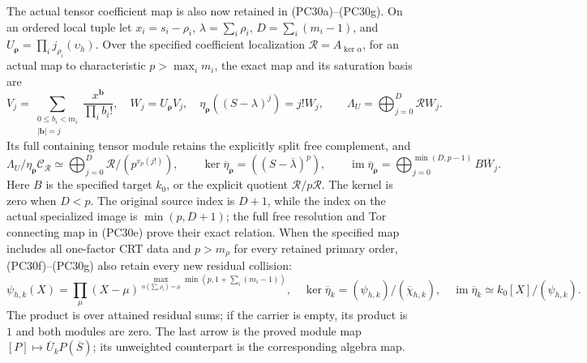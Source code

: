 The actual tensor coefficient map is also now retained in
(PC30a)--(PC30g).  On an ordered local tuple let
\(x_i=s_i-\rho_i\), \(\lambda=\sum_i\rho_i\),
\(D=\sum_i(m_i-1)\), and
\(U_{\boldsymbol\rho}=\prod_i j_{\rho_i}(\upsilon_h)\).
Over the specified coefficient localization
\(\mathscr R=A_{\ker\alpha}\), for an actual map to characteristic
\(p>\max_i m_i\), the exact map and its saturation basis are
\[
 V_j=\sum_{\substack{0\le b_i<m_i\\|\mathbf b|=j}}
            \frac{x^{\mathbf b}}{\prod_i b_i!},\quad
 W_j=U_{\boldsymbol\rho}V_j,\quad
 \eta_{\boldsymbol\rho}((S-\lambda)^j)=j!W_j,
 \qquad
 \Lambda_U=\bigoplus_{j=0}^D\mathscr R W_j.
\]
Its full containing tensor module retains the explicitly split
free complement, and
\[
 \Lambda_U/\eta_{\boldsymbol\rho}\mathcal C_{\mathscr R}
    \simeq\bigoplus_{j=0}^D
                  \mathscr R/(p^{v_p(j!)}),\qquad
 \ker\overline\eta_{\boldsymbol\rho}
      =((S-\overline\lambda)^p),\qquad
 \operatorname{im}\overline\eta_{\boldsymbol\rho}
      =\bigoplus_{j=0}^{\min(D,p-1)}B\overline W_j .
\]
Here \(B\) is the specified target \(k_0\), or the explicit
quotient \(\mathscr R/p\mathscr R\). The kernel is zero when \(D<p\).
The original source index is \(D+1\), while the index on the
actual specialized image is \(\min(p,D+1)\); the full free
resolution and Tor connecting map in (PC30e) prove their exact
relation.  When the specified map includes all one-factor CRT
data and \(p>m_\rho\) for every retained primary order, (PC30f)--(PC30g) also retain every new residual collision:
\[
 \psi_{h,k}(X)=
 \prod_{\mu}
 (X-\mu)^{
 \max_{\alpha(\sum_i\rho_i)=\mu}
            \min(p,1+\sum_i(m_i-1))},\quad
 \ker\overline\eta_k=(\psi_{h,k})/(\overline\chi_{h,k}),\quad
 \operatorname{im}\overline\eta_k\simeq k_0[X]/(\psi_{h,k}).
\]
The product is over attained residual sums; if the carrier is empty,
its product is \(1\) and both modules are zero.
The last arrow is the proved module map
\([P]\mapsto\overline U_kP(\overline S)\); its unweighted
counterpart is the corresponding algebra map.


